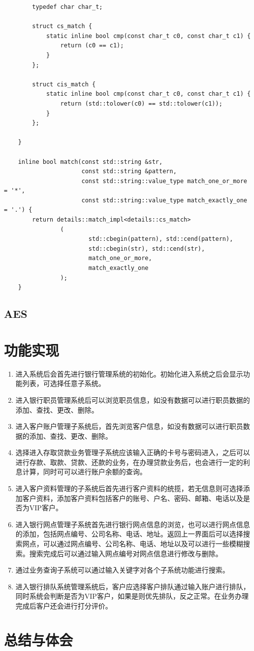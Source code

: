 \documentclass{ctexrep}
\begin{document}
\begin{verbatim}
        typedef char char_t;

        struct cs_match {
            static inline bool cmp(const char_t c0, const char_t c1) {
                return (c0 == c1);
            }
        };

        struct cis_match {
            static inline bool cmp(const char_t c0, const char_t c1) {
                return (std::tolower(c0) == std::tolower(c1));
            }
        };

    }

    inline bool match(const std::string &str,
                      const std::string &pattern,
                      const std::string::value_type match_one_or_more = '*',
                      const std::string::value_type match_exactly_one = '.') {
        return details::match_impl<details::cs_match>
                (
                        std::cbegin(pattern), std::cend(pattern),
                        std::cbegin(str), std::cend(str),
                        match_one_or_more,
                        match_exactly_one
                );
    }
\end{verbatim}

\section{AES}
\chapter{功能实现}

\begin{enumerate}
\item 进入系统后会首先进行银行管理系统的初始化。初始化进入系统之后会显示功能列表，可选择任意子系统。
\item 进入银行职员管理系统后可以浏览职员信息，如没有数据可以进行职员数据的添加、查找、更改、删除。
\item 进入客户账户管理子系统后，首先浏览客户信息，如没有数据可以进行职员数据的添加、查找、更改、删除。
\item 选择进入存取贷款业务管理子系统应该输入正确的卡号与密码进入，之后可以进行存款、取款、贷款、还款的业务，在办理贷款业务后，也会进行一定的利息计算，同时可可以进行账户余额的查询。
\item 进入客户资料管理的子系统后首先进行客户资料的统揽，若无信息则可选择添加客户资料，添加客户资料包括客户的账号、户名、密码、邮箱、电话以及是否为VIP客户。
\item 进入银行网点管理子系统首先进行银行网点信息的浏览，也可以进行网点信息的添加，包括网点编号、公司名称、电话、地址。返回上一界面后可以选择搜索网点，可以通过网点编号、公司名称、电话、地址以及可以进行一些模糊搜索。搜索完成后可以通过输入网点编号对网点信息进行修改与删除。
\item 通过业务查询子系统可以通过输入关键字对各个子系统功能进行搜索。
\item 进入银行排队系统管理系统后，客户应选择客户排队通过输入账户进行排队，同时系统会判断是否为VIP客户，如果是则优先排队，反之正常。在业务办理完成后客户还会进行打分评价。
\end{enumerate}
\chapter{总结与体会}

\end{document}
